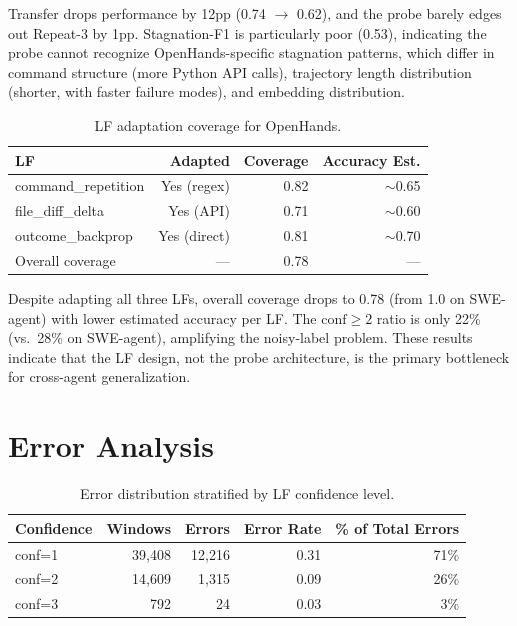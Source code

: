 \documentclass[11pt]{article}
\begin{document}
Transfer drops performance by 12pp (0.74 $\to$ 0.62), and the probe barely edges out Repeat-3 by 1pp.
Stagnation-F1 is particularly poor (0.53), indicating the probe cannot recognize OpenHands-specific stagnation patterns, which differ in command structure (more Python API calls), trajectory length distribution (shorter, with faster failure modes), and embedding distribution.

\begin{table}[h]
\centering
\caption{LF adaptation coverage for OpenHands.}
\label{tab:lf_coverage}
\begin{tabular}{lrrr}
\toprule
\textbf{LF} & \textbf{Adapted} & \textbf{Coverage} & \textbf{Accuracy Est.} \\
\midrule
command\_repetition & Yes (regex) & 0.82 & $\sim$0.65 \\
file\_diff\_delta & Yes (API) & 0.71 & $\sim$0.60 \\
outcome\_backprop & Yes (direct) & 0.81 & $\sim$0.70 \\
\midrule
Overall coverage & --- & 0.78 & --- \\
\bottomrule
\end{tabular}
\end{table}

Despite adapting all three LFs, overall coverage drops to 0.78 (from 1.0 on SWE-agent) with lower estimated accuracy per LF.
The $\text{conf}\!\geq\!2$ ratio is only 22\% (vs.\ 28\% on SWE-agent), amplifying the noisy-label problem.
These results indicate that the LF design, not the probe architecture, is the primary bottleneck for cross-agent generalization.

\section{Error Analysis}
\label{sec:error_analysis}

\begin{table}[h]
\centering
\caption{Error distribution stratified by LF confidence level.}
\label{tab:errors_conf}
\begin{tabular}{lrrrr}
\toprule
\textbf{Confidence} & \textbf{Windows} & \textbf{Errors} & \textbf{Error Rate} & \textbf{\% of Total Errors} \\
\midrule
conf=1 & 39,408 & 12,216 & 0.31 & 71\% \\
conf=2 & 14,609 & 1,315 & 0.09 & 26\% \\
conf=3 & 792 & 24 & 0.03 & 3\% \\
\bottomrule
\end{tabular}
\end{table}
\end{document}

